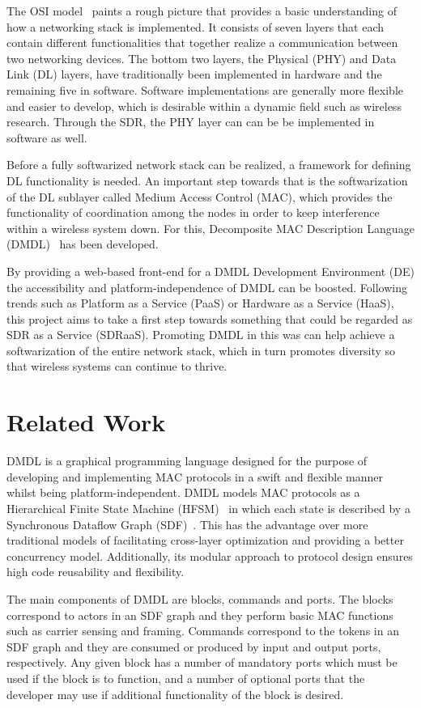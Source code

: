 \documentclass[journal,comsoc]{IEEEtran}
\begin{document}
The OSI model~\cite{osi} paints a rough picture that provides a basic understanding of
how a networking stack is implemented. It consists of seven layers that each contain different
functionalities that together realize a communication between two networking devices. The bottom
two layers, the Physical (PHY) and Data Link (DL) layers, have traditionally been implemented
in hardware and the remaining five in software. Software implementations are generally more
flexible and easier to develop, which is desirable within a dynamic field such as wireless
research. Through the SDR, the PHY layer can can be be implemented in software as well.

Before a fully softwarized network stack can be realized, a framework for defining DL functionality
is needed. An important step towards that is the softwarization of the DL sublayer
called Medium Access Control (MAC), which provides the functionality of coordination among the
nodes in order to keep interference within a wireless system down. For this,
Decomposite MAC Description Language (DMDL)~\cite{dmdl} has been developed.

By providing a web-based front-end for a DMDL Development Environment (DE) the accessibility
and platform-independence of DMDL can be boosted. Following trends such as
Platform as a Service (PaaS) or Hardware as a Service (HaaS), this project aims to take a first
step towards something that could be regarded as SDR as a Service (SDRaaS). Promoting DMDL in
this was can help achieve a softwarization of the entire network stack, which in turn promotes
diversity so that wireless systems can continue to thrive. 


\section{Related Work}
DMDL is a graphical programming language designed for the purpose of developing and implementing
MAC protocols in a swift and flexible manner whilst being platform-independent. DMDL models
MAC protocols as a Hierarchical Finite State Machine (HFSM)~\cite{hfsm} in which each state is
described by a Synchronous Dataflow Graph (SDF)~\cite{sdf}. This has the advantage over more
traditional models of facilitating cross-layer optimization and providing a better concurrency
model. Additionally, its modular approach to protocol design ensures high code reusability and
flexibility.

The main components of DMDL are blocks, commands and ports. The blocks correspond to actors
in an SDF graph and they perform basic MAC functions such as carrier sensing and framing.
Commands correspond to the tokens in an SDF graph and they are consumed or produced by input
and output ports, respectively. Any given block has a number of mandatory ports which must
be used if the block is to function, and a number of optional ports that the developer may
use if additional functionality of the block is desired.
\end{document}
